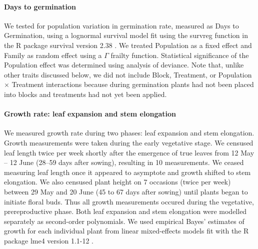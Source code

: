 \documentclass[11pt, oneside]{article}
\newcommand{\pkg}[1]{{\fontseries{b}\selectfont #1}}
\begin{document}
\paragraph{Days to germination} We tested for population variation in germination rate, measured as Days to Germination, using a lognormal survival model fit using the survreg function in the R package \pkg{survival} version 2.38 \citep{Therneau_2015}. We treated Population as a fixed effect and Family as random effect using a $\Gamma$ frailty function. Statistical significance of the Population effect was determined using analysis of deviance. Note that, unlike other traits discussed below, we did not include Block, Treatment, or Population $\times$ Treatment interactions because during germination plants had not been placed into blocks and treatments had not yet been applied.


\paragraph{Growth rate: leaf expansion and stem elongation}

We measured growth rate during two phases: leaf expansion and stem elongation. Growth measurements were taken during the early vegetative stage. We censused leaf length twice per week shortly after the emergence of true leaves from 12 May -- 12 June (28--59 days after sowing), resulting in 10 measurements. We ceased measuring leaf length once it appeared to asymptote and growth shifted to stem elongation. We also censused plant height on 7 occasions (twice per week) between 29 May and 20 June (45 to 67 days after sowing) until plants began to initiate floral buds. Thus all growth measurements occured during the vegetative, prereproductive phase. Both leaf expansion and stem elongation were modelled separately as second-order polynomials. We used empirical Bayes' estimates of growth for each individual plant from linear mixed-effects models fit with the R package \pkg{lme4} version 1.1-12 \citep{Bates_etal_2015}.
\end{document}
